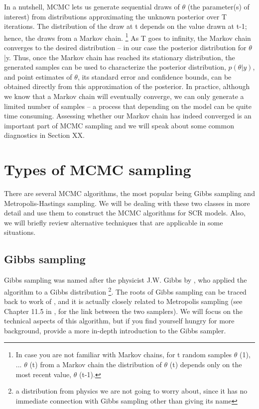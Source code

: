 In a nutshell, MCMC lets us generate sequential draws of $\theta$ (the
parameter(s) of interest) from distributions approximating the unknown
posterior over T iterations. The distribution of the draw at t depends
on the value drawn at t-1; hence, the draws from a Markov
chain. \footnote{In case you are not familiar with Markov chains, for
  t random samples $\theta$ (1), ... $\theta$ (t) from a Markov chain
  the distribution of $\theta$ (t) depends only on the most recent
  value, $\theta$ (t-1).} As T goes to infinity, the Markov chain
converges to the desired distribution – in our case the posterior
distribution for $\theta$|y. Thus, once the Markov chain has reached
its stationary distribution, the generated samples can be used to
characterize the posterior distribution, $p(\theta|y)$, and point
estimates of $\theta$, its standard error and confidence bounds, can
be obtained directly from this approximation of the posterior. In
practice, although we know that a Markov chain will eventually
converge, we can only generate a limited number of samples – a process
that depending on the model can be quite time consuming. Assessing
whether our Markov chain has indeed converged is an important part of
MCMC sampling and we will speak about some common diagnostics in
Section XX.



\section{Types of MCMC sampling}

There are several MCMC algorithms, the most popular being Gibbs
sampling and Metropolis-Hastings sampling. We will be dealing with
these two classes in more detail and use them to construct the MCMC
algorithms for SCR models. Also, we will briefly review alternative
techniques that are applicable in some situations.


\subsection{Gibbs sampling}

Gibbs sampling was named after the physicist J.W. Gibbs by
\citet{geman_geman:1984}, who applied the algorithm to a Gibbs
distribution \footnote{a distribution from physics we are not going to
  worry about, since it has no immediate connection with Gibbs
  sampling other than giving its name}. The roots of Gibbs sampling
can be traced back to work of \citet{metropolis_ulam:1953}, and it is
actually closely related to Metropolis sampling (see Chapter 11.5 in
\citet{gelman_etal:2004}, for the link between the two samplers). We
will focus on the technical aspects of this algorithm, but if you find
yourself hungry for more background, \citet{casella_george:1992}
provide a more in-depth introduction to the Gibbs sampler.


